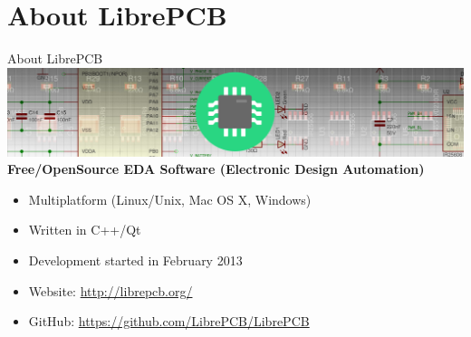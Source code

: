 \section{About LibrePCB}

\begin{frame}{About LibrePCB}
  \includegraphics[width=\linewidth]{images/about_header.png} \linebreak\linebreak
  \textbf{Free/OpenSource EDA Software (Electronic Design Automation)}
  \begin{itemize}
    \item Multiplatform (Linux/Unix, Mac OS X, Windows)
    \item Written in C++/Qt
    \item Development started in February 2013
    \item Website: \url{http://librepcb.org/}
    \item GitHub: \url{https://github.com/LibrePCB/LibrePCB}
  \end{itemize}
\end{frame}